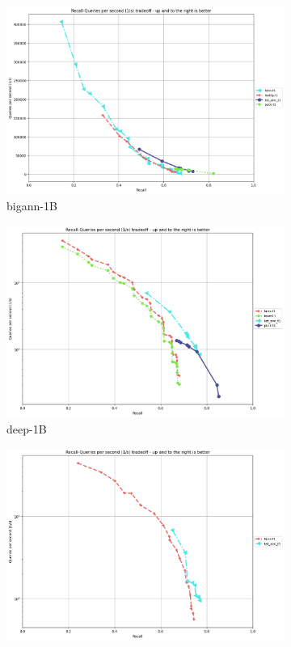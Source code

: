 \begin{figure}[ht]
  \begin{subfigure}{0.48\textwidth}
    \centering
    \includegraphics[width=\linewidth]{../t1_t2/results/T1/neurips21/bigann-1B.png}
      \caption{bigann-1B}
  \end{subfigure}
  \begin{subfigure}{0.48\textwidth}
    \centering
    \includegraphics[width=\linewidth]{../t1_t2/results/T1/neurips21/deep-1B.png}
    \caption{deep-1B}
  \end{subfigure}
  \begin{subfigure}{0.48\textwidth}
    \centering
    \includegraphics[width=\linewidth]{../t1_t2/results/T1/neurips21/msspacev-1B.png}

\end{subfigure}
\end{figure}
